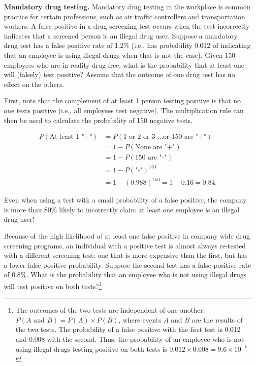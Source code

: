 \begin{example}{\textbf{Mandatory drug testing.} Mandatory drug testing in the workplace is common practice for certain professions, such as air traffic controllers and transportation workers.  A false positive in a drug screening test occurs when the test incorrectly indicates that a screened person is an illegal drug user. Suppose a mandatory drug test has a false positive rate of 1.2\% (i.e., has probability  0.012 of indicating that an employee is using illegal drugs when that is not the case).  Given 150 employees who are in reality drug free, what is the probability that at least one will (falsely) test positive? Assume that the outcome of one drug test has no effect on the others.}

First, note that the complement of at least 1 person testing positive is that no one tests positive (i.e., all employees test negative). The multiplication rule can then be used to calculate the probability of 150 negative tests.

   \begin{align*} 
   P(\text{At least 1 "+"}) &= P(\text{1 or 2 or 3 \ldots or 150 are "+"}) \\
           &= 1 - P(\text{None are "+"}) \\
           & = 1 - P(\text{150 are "-"}) \\
		   &= 1 - P(\text{"-"})^{150} \\
           &= 1 - (0.988)^{150} = 1 - 0.16 = 0.84.
    \end{align*}
 

Even when using a test with a small probability of a false positive, the company is more than 80\% likely to incorrectly claim at least one employee is an illegal drug user!

\end{example}

\begin{exercise}
Because of the high likelihood of at least one false positive in company wide drug screening programs, an individual with a positive test is almost always re-tested with a different screening test: one that is more expensive than the first, but has a lower false positive probability. Suppose the second test has a false positive rate of 0.8\%.  What is the probability that an employee who is not using illegal drugs will test positive on both tests?\footnote{The outcomes of the two tests are independent of one another; $P (A\text{ and } B) = P(A) \times P(B)$, where events $A$ and $B$ are the results of the two tests. The probability of a false positive with the first test is 0.012 and 0.008 with the second. Thus, the probability of an employee who is not using illegal drugs testing positive on both tests is $0.012 \times 0.008 = 9.6 \times 10^{-5}$}

\end{exercise}

